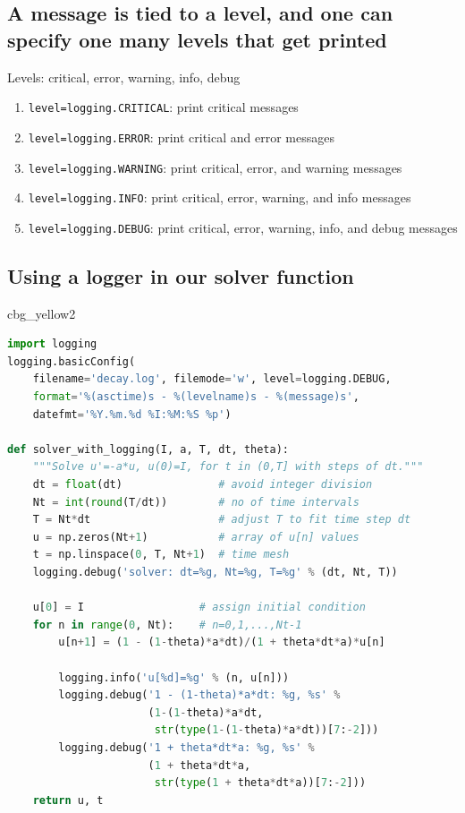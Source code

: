 \documentclass[%
oneside,                 %
final,                   %
10pt]{article}
\newenvironment{_cod_tight}[1]{
   \def\FrameCommand{\colorbox{#1}}
   \FrameRule0.6pt\MakeFramed {\FrameRestore}\vskip3mm}
   {\vskip0mm\endMakeFramed}
\newenvironment{cod}[1]{
\bgroup\rmfamily
\fboxsep=0mm\relax
\begin{_cod_tight}{#1}
\list{}{\parsep=-2mm\parskip=0mm\topsep=0pt\leftmargin=2mm
\rightmargin=2\leftmargin\leftmargin=4pt\relax}
\item\relax}
{\endlist\end{_cod_tight}\egroup}
\begin{document}
\subsection*{A message is tied to a level, and one can specify one many levels that get printed}

Levels: critical, error, warning, info, debug

\begin{enumerate}
\item \texttt{level=logging.CRITICAL}: print critical messages

\item \texttt{level=logging.ERROR}: print critical and error messages

\item \texttt{level=logging.WARNING}: print critical, error, and warning messages

\item \texttt{level=logging.INFO}: print critical, error, warning, and info messages

\item \texttt{level=logging.DEBUG}: print critical, error, warning, info, and debug messages
\end{enumerate}

\noindent
\subsection*{Using a logger in our solver function}

\begin{cod}{cbg_yellow2}\begin{lstlisting}[language=Python,style=simple,xleftmargin=2mm]
import logging
logging.basicConfig(
    filename='decay.log', filemode='w', level=logging.DEBUG,
    format='%(asctime)s - %(levelname)s - %(message)s',
    datefmt='%Y.%m.%d %I:%M:%S %p')

def solver_with_logging(I, a, T, dt, theta):
    """Solve u'=-a*u, u(0)=I, for t in (0,T] with steps of dt."""
    dt = float(dt)               # avoid integer division
    Nt = int(round(T/dt))        # no of time intervals
    T = Nt*dt                    # adjust T to fit time step dt
    u = np.zeros(Nt+1)           # array of u[n] values
    t = np.linspace(0, T, Nt+1)  # time mesh
    logging.debug('solver: dt=%g, Nt=%g, T=%g' % (dt, Nt, T))

    u[0] = I                  # assign initial condition
    for n in range(0, Nt):    # n=0,1,...,Nt-1
        u[n+1] = (1 - (1-theta)*a*dt)/(1 + theta*dt*a)*u[n]

        logging.info('u[%d]=%g' % (n, u[n]))
        logging.debug('1 - (1-theta)*a*dt: %g, %s' %
                      (1-(1-theta)*a*dt,
                       str(type(1-(1-theta)*a*dt))[7:-2]))
        logging.debug('1 + theta*dt*a: %g, %s' %
                      (1 + theta*dt*a,
                       str(type(1 + theta*dt*a))[7:-2]))
    return u, t
\end{lstlisting}\end{cod}
\noindent
\end{document}

